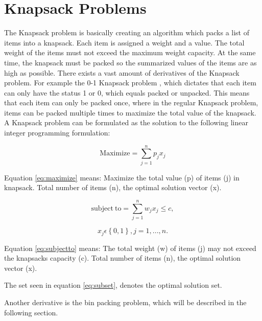 \section{Knapsack Problems}
\label{sec:knapsack}
The Knapsack problem is basically creating an algorithm which packs a list of items into a knapsack. Each item is assigned a weight and a value. The total weight of the items must not exceed the maximum weight capacity. At the same time, the knapsack must be packed so the summarized values of the items are as high as possible. There exists a vast amount of derivatives of the Knapsack problem. For example the 0-1 Knapsack problem \citep{knapsackproblems}, which dictates that each item can only have the status 1 or 0, which equals packed or unpacked. This means that each item can only be packed once, where in the regular Knapsack problem, items can be packed multiple times to maximize the total value of the knapsack. A Knapsack problem can be formulated as the solution to the following linear integer programming formulation:


\begin{equation}
	\label{eq:maximize}
	\mathrm{Maximize} = \displaystyle\sum_{j=1}^{n} p_{j}x_{j}
\end{equation}

Equation \ref{eq:maximize} means: Maximize the total value (p) of items (j) in knapsack. Total number of items (n), the optimal solution vector (x).

\begin{equation}
	\label{eq:subjectto}
	\mathrm{subject~to} = \displaystyle\sum_{j=1}^{n} w_{j}x_{j}\leq c,
\end{equation}


\begin{equation}
	\label{eq:subset}
	x_{j}\displaystyle\epsilon\left\{ 0,1 \right \}, j=1,...,n.
\end{equation}

Equation \ref{eq:subjectto} means: The total weight (w) of items (j) may not exceed the knapsacks capacity (c). Total number of items (n), the optimal solution vector (x).

The set seen in equation \ref{eq:subset}, denotes the optimal solution set. 

\citep{knapsackproblems}
\newline
Another derivative is the bin packing problem, which will be described in the following section.